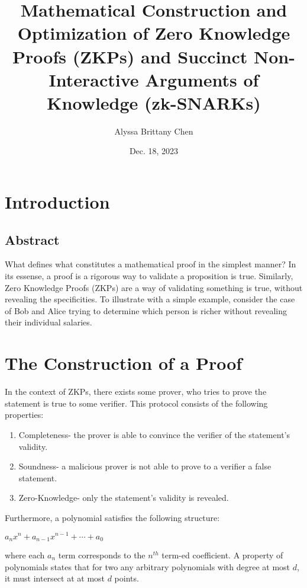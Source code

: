 \documentclass[12pt]{article}
\title{Mathematical Construction and Optimization of Zero Knowledge Proofs (ZKPs) and Succinct Non-Interactive Arguments of Knowledge (zk-SNARKs) }
\author{Alyssa Brittany Chen}
\date{Dec. 18, 2023}
\begin{document}
\maketitle


\tableofcontents

\newpage

\section{Introduction}

\subsection{Abstract}
What defines what constitutes a mathematical proof in the simplest manner? In its essense, a proof is a rigorous way to validate a proposition is true. Similarly, Zero Knowledge Proofs (ZKPs) are a way of validating something is true, without revealing the specificities. To illustrate with a simple example, consider the case of Bob and Alice trying to determine which person is richer without revealing their individual salaries.

\section{The Construction of a Proof}
In the context of ZKPs, there exists some prover, who tries to prove the statement is true to some verifier. This protocol consists of the following properties:
\begin{enumerate}
    \item Completeness- the prover is able to convince the verifier of the statement's validity.
    \item Soundness- a malicious prover is not able to prove to a verifier a false statement.
    \item Zero-Knowledge- only the statement's validity is revealed.
\end{enumerate}

Furthermore, a polynomial satisfies the following structure:
\begin{center}
    \( a_n{}x^n + a_{n-1}{}x^{n-1} + \cdots + a_0\)
\end{center}

where each \( a_n \) term corresponds to the \(n^{th}\) term-ed coefficient. A property of polynomials states that for two any arbitrary polynomials with degree at most \(d\),
it must intersect at at most \(d\) points. 
\end{document}
